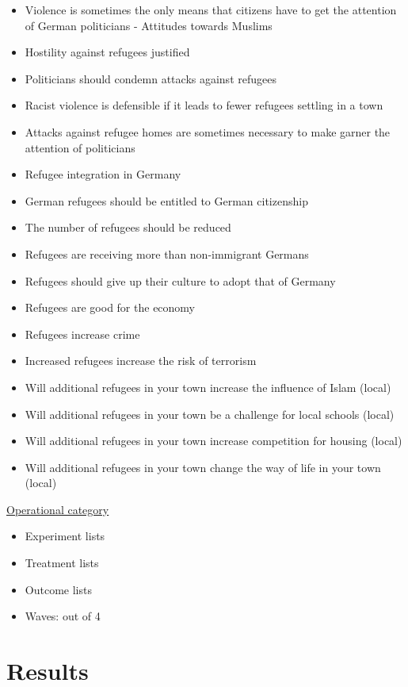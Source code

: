 \documentclass[
]{article}
\begin{document}
\begin{itemize}
\item
  Violence is sometimes the only means that citizens have to get the
  attention of German politicians - Attitudes towards Muslims
\item
  Hostility against refugees justified
\item
  Politicians should condemn attacks against refugees
\item
  Racist violence is defensible if it leads to fewer refugees settling
  in a town
\item
  Attacks against refugee homes are sometimes necessary to make garner
  the attention of politicians
\item
  Refugee integration in Germany
\item
  German refugees should be entitled to German citizenship
\item
  The number of refugees should be reduced
\item
  Refugees are receiving more than non-immigrant Germans
\item
  Refugees should give up their culture to adopt that of Germany
\item
  Refugees are good for the economy
\item
  Refugees increase crime
\item
  Increased refugees increase the risk of terrorism
\item
  Will additional refugees in your town increase the influence of Islam
  (local)
\item
  Will additional refugees in your town be a challenge for local schools
  (local)
\item
  Will additional refugees in your town increase competition for housing
  (local)
\item
  Will additional refugees in your town change the way of life in your
  town (local)
\end{itemize}

\uline{Operational category}

\begin{itemize}
\item
  Experiment lists
\item
  Treatment lists
\item
  Outcome lists
\item
  Waves: out of 4
\end{itemize}

\hypertarget{results}{%
\section{Results}\label{results}}
\end{document}
